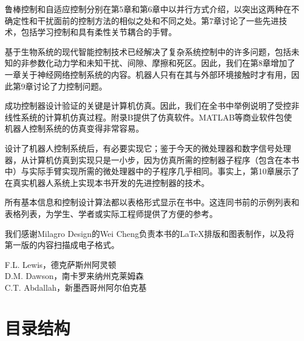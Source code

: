 \documentclass[UTF8,a4paper]{ctexart}
\begin{document}
鲁棒控制和自适应控制分别在第5章和第6章中以并行方式介绍，以突出这两种在不确定性和干扰面前的控制方法的相似之处和不同之处。第7章讨论了一些先进技术，包括学习控制和具有柔性关节耦合的手臂。

基于生物系统的现代智能控制技术已经解决了复杂系统控制中的许多问题，包括未知的非参数化动力学和未知干扰、间隙、摩擦和死区。因此，我们在第8章增加了一章关于神经网络控制系统的内容。机器人只有在其与外部环境接触时才有用，因此第9章讨论了力控制问题。

成功控制器设计验证的关键是计算机仿真。因此，我们在全书中举例说明了受控非线性系统的计算机仿真过程。附录B提供了仿真软件。MATLAB等商业软件包使机器人控制系统的仿真变得非常容易。

设计了机器人控制系统后，有必要实现它；鉴于今天的微处理器和数字信号处理器，从计算机仿真到实现只是一小步，因为仿真所需的控制器子程序（包含在本书中）与实际手臂实现所需的微处理器中的子程序几乎相同。事实上，第10章展示了在真实机器人系统上实现本书开发的先进控制器的技术。

所有基本信息和控制设计算法都以表格形式显示在书中。这连同书前的示例列表和表格列表，为学生、学者或实际工程师提供了方便的参考。

我们感谢Milagro Design的Wei Cheng负责本书的LaTeX排版和图表制作，以及将第一版的内容扫描成电子格式。

\begin{flushright}
F.L. Lewis，德克萨斯州阿灵顿\\
D.M. Dawson，南卡罗来纳州克莱姆森\\
C.T. Abdallah，新墨西哥州阿尔伯克基
\end{flushright}

\section{目录结构}
\end{document}
